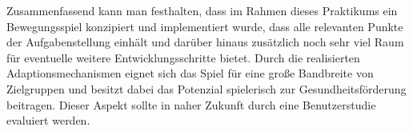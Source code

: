 Zusammenfassend kann man festhalten, dass im Rahmen dieses Praktikums ein Bewegungsspiel konzipiert und implementiert wurde, dass alle relevanten Punkte der Aufgabenstellung einhält und darüber hinaus zusätzlich noch sehr viel Raum für eventuelle weitere Entwicklungsschritte bietet. Durch die realisierten Adaptionsmechanismen eignet sich das Spiel für eine große Bandbreite von Zielgruppen und besitzt dabei das Potenzial spielerisch zur Gesundheitsförderung beitragen. Dieser Aspekt sollte in naher Zukunft durch eine Benutzerstudie evaluiert werden.
